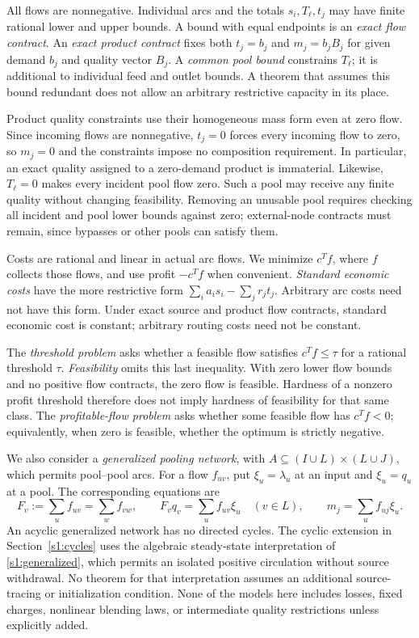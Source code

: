 All flows are nonnegative. Individual arcs and the totals $s_i,T_\ell,t_j$
may have finite rational lower and upper bounds. A bound with equal
endpoints is an \emph{exact flow contract}. An \emph{exact product
contract} fixes both $t_j=b_j$ and $m_j=b_jB_j$ for given demand $b_j$
and quality vector $B_j$. A \emph{common pool bound} constrains $T_\ell$;
it is additional to individual feed and outlet bounds. A theorem that
assumes this bound redundant does not allow an arbitrary restrictive
capacity in its place.

Product quality constraints use their homogeneous mass form even at
zero flow. Since incoming flows are nonnegative, $t_j=0$ forces every
incoming flow to zero, so $m_j=0$ and the constraints impose no composition
requirement. In particular, an exact quality assigned to a zero-demand
product is immaterial. Likewise, $T_\ell=0$ makes every incident pool
flow zero. Such a pool may receive any finite quality without changing
feasibility. Removing an unusable pool requires checking all incident
and pool lower bounds against zero; external-node contracts must remain,
since bypasses or other pools can satisfy them.

Costs are rational and linear in actual arc flows. We minimize $c^Tf$,
where $f$ collects those flows, and use profit $-c^Tf$ when convenient.
\emph{Standard economic costs} have the more restrictive form
$\sum_i a_i s_i-\sum_j r_jt_j$. Arbitrary arc costs need not have this
form. Under exact source and product flow contracts, standard economic
cost is constant; arbitrary routing costs need not be constant.

The \emph{threshold problem} asks whether a feasible flow satisfies
$c^Tf\le\tau$ for a rational threshold $\tau$. \emph{Feasibility} omits
this last inequality. With zero lower flow bounds and no positive flow
contracts, the zero flow is feasible. Hardness of a nonzero profit
threshold therefore does not imply hardness of feasibility for that
same class. The \emph{profitable-flow problem} asks whether some feasible
flow has $c^Tf<0$; equivalently, when zero is feasible, whether the optimum
is strictly negative.

We also consider a \emph{generalized pooling network}, with
$A\subseteq(I\cup L)\times(L\cup J)$, which permits pool--pool arcs.
For a flow $f_{uv}$, put $\xi_u=\lambda_u$ at an input and $\xi_u=q_u$
at a pool. The corresponding equations are
\begin{equation}
 F_v:=\sum_u f_{uv}=\sum_w f_{vw},\qquad
 F_vq_v=\sum_u f_{uv}\xi_u \quad(v\in L),\qquad
 m_j=\sum_u f_{uj}\xi_u.\label{s1:generalized}
\end{equation}
An acyclic generalized network has no directed cycles. The cyclic
extension in Section~\ref{s1:cycles} uses the algebraic steady-state
interpretation of \eqref{s1:generalized}, which permits an isolated
positive circulation without source withdrawal. No theorem for that
interpretation assumes an additional source-tracing or initialization
condition. None of the models here includes losses, fixed charges,
nonlinear blending laws, or intermediate quality restrictions unless
explicitly added.

